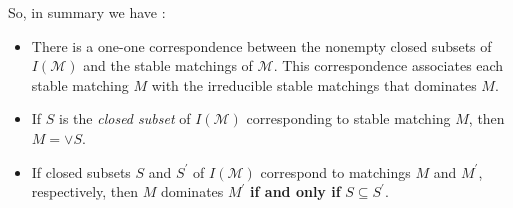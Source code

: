 \begin{theo}
So, in summary we have : 
\begin{itemize}
    \item There is a one-one correspondence between the nonempty closed subsets of $I(\mathcal{M})$ and the stable matchings of $\mathcal{M}$. This correspondence associates each stable matching $M$ with the irreducible stable matchings that dominates $M$.
    \item  If $S$ is the \textit{closed subset} of $I(\mathcal{M})$ corresponding to stable matching $M$, then $M = \vee S$.
    \item If closed subsets $S$ and $S^\prime$ of $I(\mathcal{M})$ correspond to matchings $M$ and $M^\prime$, respectively, then $M$ dominates $M^\prime$ \textbf{if and only if} $S \subseteq S^\prime$.
\end{itemize}

\end{theo}